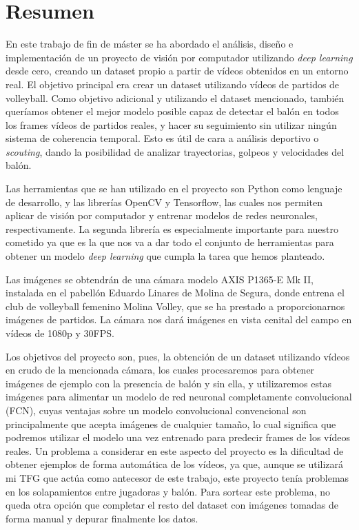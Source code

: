 \section*{Resumen}

En este trabajo de fin de máster se ha abordado el análisis, diseño e implementación de un proyecto de visión por computador utilizando \textit{deep learning} desde cero, creando un dataset propio a partir de vídeos obtenidos en un entorno real. El objetivo principal era crear un dataset utilizando vídeos de partidos de volleyball. Como objetivo adicional y utilizando el dataset mencionado, también queríamos obtener el mejor modelo posible capaz de detectar el balón en todos los frames vídeos de partidos reales, y hacer su seguimiento sin utilizar ningún sistema de coherencia temporal. Esto es útil de cara a análisis deportivo o \textit{scouting}, dando la posibilidad de analizar trayectorias, golpeos y velocidades del balón.

Las herramientas que se han utilizado en el proyecto son Python como lenguaje de desarrollo, y las librerías OpenCV y Tensorflow, las cuales nos permiten aplicar de visión por computador y entrenar modelos de redes neuronales, respectivamente. La segunda librería es especialmente importante para nuestro cometido ya que es la que nos va a dar todo el conjunto de herramientas para obtener un modelo \textit{deep learning} que cumpla la tarea que hemos planteado.

Las imágenes se obtendrán de una cámara modelo AXIS P1365-E Mk II, instalada en el pabellón Eduardo Linares de Molina de Segura, donde entrena el club de volleyball femenino Molina Volley, que se ha prestado a proporcionarnos imágenes de partidos. La cámara nos dará imágenes en vista cenital del campo en vídeos de 1080p y 30FPS.

Los objetivos del proyecto son, pues, la obtención de un dataset utilizando vídeos en crudo de la mencionada cámara, los cuales procesaremos para obtener imágenes de ejemplo con la presencia de balón y sin ella, y utilizaremos estas imágenes para alimentar un modelo de red neuronal completamente convolucional (FCN), cuyas ventajas sobre un modelo convolucional convencional son principalmente que acepta imágenes de cualquier tamaño, lo cual significa que podremos utilizar el modelo una vez entrenado para predecir frames de los vídeos reales. Un problema a considerar en este aspecto del proyecto es la dificultad de obtener ejemplos de forma automática de los vídeos, ya que, aunque se utilizará mi TFG que actúa como antecesor de este trabajo, este proyecto tenía problemas en los solapamientos entre jugadoras y balón. Para sortear este problema, no queda otra opción que completar el resto del dataset con imágenes tomadas de forma manual y depurar finalmente los datos.

